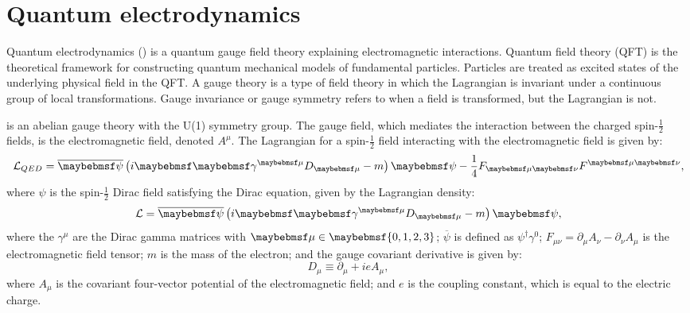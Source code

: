 \section{Quantum electrodynamics}


Quantum electrodynamics (\QED) is a  quantum gauge field theory explaining electromagnetic interactions. Quantum field theory (QFT) is the theoretical framework for constructing quantum mechanical models of fundamental particles. Particles are treated as excited states of the underlying physical field in the QFT.  A gauge theory is a type of field theory in which the Lagrangian is invariant under a continuous group of local transformations.  Gauge invariance or gauge symmetry refers to when a field is transformed, but the Lagrangian is not.

\QED is an abelian gauge theory with the  U(1) symmetry group. The gauge field, which mediates the interaction between the charged spin-$\frac{1}{2}$ fields, is the electromagnetic field, denoted $A^{\mu}$. The \QED Lagrangian \cite{peskin1995introduction} for a spin-$\frac{1}{2}$ field interacting with the electromagnetic field is given by:
\begin{equation}
\Lagr_{QED} = \overline{\psi} \left( i\Dstroke - m \right)\psi -  \frac{1}{4}F_{\mu\nu}F^{\mu\nu},
\end{equation}
where $\psi$ is the spin-$\frac{1}{2}$ Dirac field satisfying the Dirac equation, given by the Lagrangian density:
\begin{equation}
\Lagr =  \overline{\psi} \left( i\Dstroke - m \right)\psi,
\end{equation}
where the $\gamma^{\mu}$ are the Dirac gamma matrices with $\mu\in\braces{0,1,2,3}$; $\overline{\psi}$ is defined as $\psi^{\dagger}\gamma^0$; $F_{\mu\nu} = \partial_{\mu}A_{\nu} - \partial_{\nu}A_{\mu}$ is the electromagnetic field tensor; $m$ is the mass of the electron; and the gauge covariant derivative is given by:
\begin{equation}
D_{\mu} \equiv \partial_{\mu} + ieA_{\mu},
\end{equation}
where $A_{\mu}$ is the covariant four-vector potential of the electromagnetic field; and $e$ is the coupling constant, which is equal to the electric charge.


